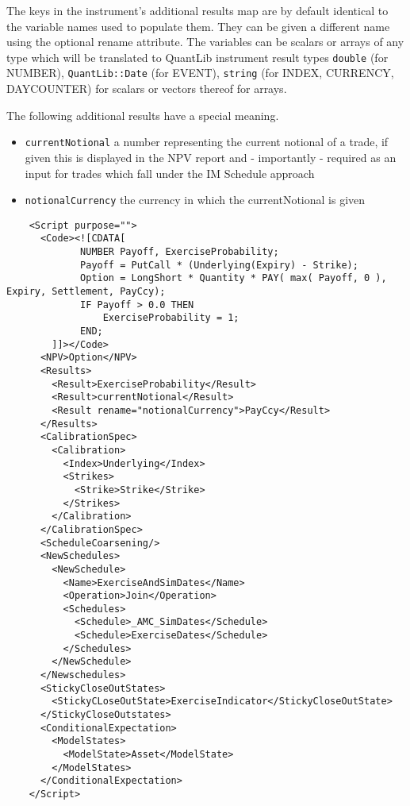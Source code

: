 The keys in the instrument's additional results map are by default identical to the variable names used to populate
them. They can be given a different name using the optional rename attribute. The variables can be scalars or arrays of
any type which will be translated to QuantLib instrument result types \verb+double+ (for NUMBER), \verb+QuantLib::Date+
(for EVENT), \verb+string+ (for INDEX, CURRENCY, DAYCOUNTER) for scalars or vectors thereof for arrays.

The following additional results have a special meaning.

\begin{itemize}
\item \verb+currentNotional+ a number representing the current notional of a trade, if given this is displayed in the
  NPV report and - importantly - required as an input for trades which fall under the IM Schedule approach
\item \verb+notionalCurrency+ the currency in which the currentNotional is given
\end{itemize}

\begin{verbatim}
    <Script purpose="">
      <Code><![CDATA[
             NUMBER Payoff, ExerciseProbability;
             Payoff = PutCall * (Underlying(Expiry) - Strike);
             Option = LongShort * Quantity * PAY( max( Payoff, 0 ), Expiry, Settlement, PayCcy);
             IF Payoff > 0.0 THEN
                 ExerciseProbability = 1;
             END;
        ]]></Code>
      <NPV>Option</NPV>
      <Results>
        <Result>ExerciseProbability</Result>
        <Result>currentNotional</Result>
        <Result rename="notionalCurrency">PayCcy</Result>
      </Results>
      <CalibrationSpec>
        <Calibration>
          <Index>Underlying</Index>
          <Strikes>
            <Strike>Strike</Strike>
          </Strikes>
        </Calibration>
      </CalibrationSpec>
      <ScheduleCoarsening/>
      <NewSchedules>
        <NewSchedule>
          <Name>ExerciseAndSimDates</Name>
          <Operation>Join</Operation>
          <Schedules>
            <Schedule>_AMC_SimDates</Schedule>
            <Schedule>ExerciseDates</Schedule>
          </Schedules>
        </NewSchedule>
      </Newschedules>
      <StickyCloseOutStates>
        <StickyCLoseOutState>ExerciseIndicator</StickyCloseOutState>
      </StickyCloseOutstates>
      <ConditionalExpectation>
        <ModelStates>
          <ModelState>Asset</ModelState>
        </ModelStates>
      </ConditionalExpectation>
    </Script>
\end{verbatim}
